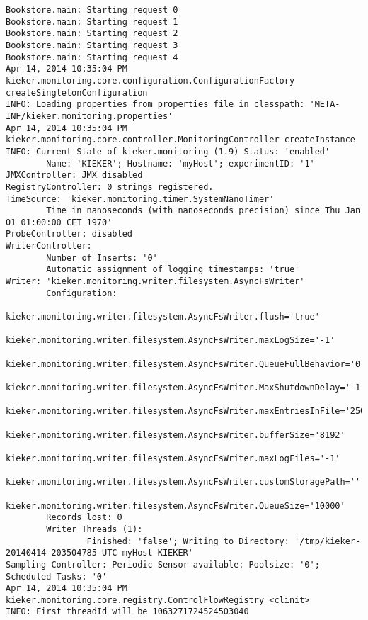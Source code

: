 \setTextListing
\begin{lstlisting}[caption=Execution of the Bookstore with AspectJ trace instrumentation (Section~\ref{sec:traceAnalysis:instr:AspectJ})]
Bookstore.main: Starting request 0
Bookstore.main: Starting request 1
Bookstore.main: Starting request 2
Bookstore.main: Starting request 3
Bookstore.main: Starting request 4
Apr 14, 2014 10:35:04 PM kieker.monitoring.core.configuration.ConfigurationFactory createSingletonConfiguration
INFO: Loading properties from properties file in classpath: 'META-INF/kieker.monitoring.properties'
Apr 14, 2014 10:35:04 PM kieker.monitoring.core.controller.MonitoringController createInstance
INFO: Current State of kieker.monitoring (1.9) Status: 'enabled'
        Name: 'KIEKER'; Hostname: 'myHost'; experimentID: '1'
JMXController: JMX disabled
RegistryController: 0 strings registered.
TimeSource: 'kieker.monitoring.timer.SystemNanoTimer'
        Time in nanoseconds (with nanoseconds precision) since Thu Jan 01 01:00:00 CET 1970'
ProbeController: disabled
WriterController:
        Number of Inserts: '0'
        Automatic assignment of logging timestamps: 'true'
Writer: 'kieker.monitoring.writer.filesystem.AsyncFsWriter'
        Configuration:
                kieker.monitoring.writer.filesystem.AsyncFsWriter.flush='true'
                kieker.monitoring.writer.filesystem.AsyncFsWriter.maxLogSize='-1'
                kieker.monitoring.writer.filesystem.AsyncFsWriter.QueueFullBehavior='0'
                kieker.monitoring.writer.filesystem.AsyncFsWriter.MaxShutdownDelay='-1'
                kieker.monitoring.writer.filesystem.AsyncFsWriter.maxEntriesInFile='25000'
                kieker.monitoring.writer.filesystem.AsyncFsWriter.bufferSize='8192'
                kieker.monitoring.writer.filesystem.AsyncFsWriter.maxLogFiles='-1'
                kieker.monitoring.writer.filesystem.AsyncFsWriter.customStoragePath=''
                kieker.monitoring.writer.filesystem.AsyncFsWriter.QueueSize='10000'
        Records lost: 0
        Writer Threads (1): 
                Finished: 'false'; Writing to Directory: '/tmp/kieker-20140414-203504785-UTC-myHost-KIEKER'
Sampling Controller: Periodic Sensor available: Poolsize: '0'; Scheduled Tasks: '0'
Apr 14, 2014 10:35:04 PM kieker.monitoring.core.registry.ControlFlowRegistry <clinit>
INFO: First threadId will be 1063271724524503040
\end{lstlisting}


